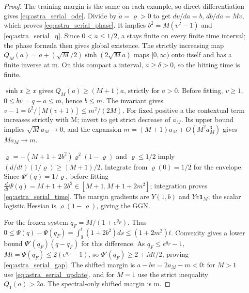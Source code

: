 \begin{proof}
The training margin is the same on each example, so direct differentiation
gives \eqref{eq:astra_serial_ode}. Divide by $\dot a=\varrho>0$ to get
$dv/da=b$, $db/da=Mv$, which proves \eqref{eq:astra_serial_phase}.
It implies $b^2=M(v^2-1)$ and \eqref{eq:astra_serial_q}.
Since $0<\dot a\le1/2$, a stays finite on every finite time interval;
the phase formula then gives global existence. The strictly increasing
map $Q_M(a)=a+(\sqrt M/2)\sinh(2\sqrt M a)$ maps $[0,\infty)$
onto itself and has a finite inverse at m. On this compact a interval,
$\dot a\ge\delta>0$, so the hitting time is finite.

$\sinh x\ge x$ gives $Q_M(a)\ge(M+1)a$, strictly for $a>0$.
Before fitting, $v\ge1$, $0\le bv=q-a\le m$, hence $b\le m$.
The invariant gives $v-1=b^2/[M(v+1)]\le m^2/(2M)$.
For fixed positive a the contextual term increases strictly with M;
invert to get strict decrease of $a_M$. Its upper bound implies
$\sqrt M a_M\to0$, and the expansion
$m=(M+1)a_M+O(M^2a_M^3)$ gives $Ma_M\to m$.

$\dot\varrho=-(M+1+2b^2)\varrho^2(1-\varrho)$ and
$\varrho\le1/2$ imply $(d/dt)(1/\varrho)\ge(M+1)/2$.
Integrate from $\varrho(0)=1/2$ for the envelope.
Since $\Psi'(q)=1/\varrho$, before fitting
$\frac d{dt}\Psi(q)=M+1+2b^2\in[M+1,M+1+2m^2]$;
integration proves \eqref{eq:astra_serial_time}.
The margin gradients are $Y(1,b)$ and $Yv\boldsymbol1_M$;
the scalar logistic Hessian is $\varrho(1-\varrho)$, giving the GGN.

For the frozen system $\dot q_F=M/(1+e^{q_F})$. Thus
$0\le\Psi(q)-\Psi(q_F)=\int_0^t(1+2b^2)ds\le(1+2m^2)t$.
Convexity gives a lower bound $\Psi'(q_F)(q-q_F)$ for this difference.
As $q_F\le e^{q_F}-1$,
$Mt=\Psi(q_F)\le2(e^{q_F}-1)$, so
$\Psi'(q_F)\ge2+Mt/2$, proving \eqref{eq:astra_serial_gap}.
The shifted margin is $a-bv=2a_M-m<0$: for $M>1$ use
\eqref{eq:astra_serial_update}, and for $M=1$ use the strict
inequality $Q_1(a)>2a$. The spectral-only shifted margin is m.
\end{proof}

